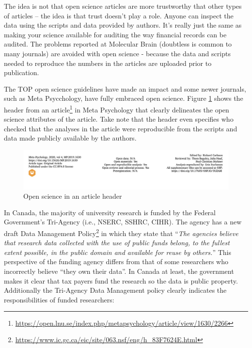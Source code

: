 \documentclass[
]{krantz}
\renewcommand{\href}[2]{#2\footnote{\url{#1}}}
\begin{document}
The idea is not that open science articles are more trustworthy that other types of articles -- the idea is that trust doesn't play a role. Anyone can inspect the data using the scripts and data provided by authors. It's really just the same as making your science available for auditing the way financial records can be audited. The problems reported at Molecular Brain (doubtless is common to many journals) are avoided with open science - because the data and scripts needed to reproduce the numbers in the articles are uploaded prior to publication.

The TOP open science guidelines have made an impact and some newer journals, such as Meta Psycchology, have fully embraced open science. Figure \ref{fig:metapsychology} shows the header from an \href{https://open.lnu.se/index.php/metapsychology/article/view/1630/2266}{article} in Meta Psychology that clearly delineates the open science attributes of the article. Take note that the header even specifies who checked that the analyses in the article were reproducible from the scripts and data made publicly available by the authors.

\begin{figure}
\includegraphics[width=1\linewidth]{ch_score_items/images/screenshot_metapsychology} \caption{Open science in an article header}\label{fig:metapsychology}
\end{figure}

In Canada, the majority of university research is funded by the Federal Government's Tri-Agency (i.e., NSERC, SSHRC, CIHR). The agency has a new draft \href{https://www.ic.gc.ca/eic/site/063.nsf/eng/h_83F7624E.html}{Data Management Policy} in which they state that ``\emph{The agencies believe that research data collected with the use of public funds belong, to the fullest extent possible, in the public domain and available for reuse by others.}'' This perspective of the funding agency differs from that of some researchers who incorrectly believe ``they own their data''. In Canada at least, the government makes it clear that tax payers fund the research so the data is public property. Additionally the Tri-Agency Data Management policy clearly indicates the responsibilities of funded researchers:
\end{document}
